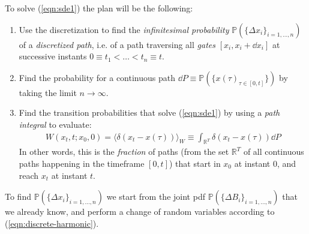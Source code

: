 \documentclass[../template.tex]{subfiles}
\begin{document}
To solve (\ref{eqn:sde1}) the plan will be the following:
\begin{enumerate}
    \item Use the discretization to find the \textit{infinitesimal probability} $\mathbb{P}(\{\Delta x_i\}_{i=1,\dots,n})$ of a \textit{discretized path}, i.e. of a path traversing all \textit{gates} $[x_i, x_i + \dd{x_i}]$ at successive instants $0 \equiv t_1 < \dots < t_n \equiv t$.
    \item Find the probability for a continuous path $\dd{P} \equiv \mathbb{P}(\{x(\tau)_{\tau \in [0,t]}\})$ by taking the limit $n \to \infty$.
    \item Find the transition probabilities that solve (\ref{eqn:sde1}) by using a \textit{path integral} to evaluate:
    \begin{align*}
        W(x_t,t;x_0,0) = \langle \delta(x_t - x(\tau)) \rangle_W \equiv \int_{\mathbb{R}^T} \delta(x_t - x(\tau)) \dd{P}    
    \end{align*}    
    In other words, this is the \textit{fraction} of paths (from the set $\mathbb{R}^T$ of all continuous paths happening in the timeframe $[0,t]$) that start in $x_0$ at instant $0$, and reach $x_t$ at instant $t$.  
\end{enumerate}

To find $\mathbb{P}(\{\Delta x_i\}_{i=1,\dots,n})$ we start from the joint pdf $\mathbb{P}(\{\Delta B_i\}_{i=1, \dots, n})$ that we already know, and perform a change of random variables according to (\ref{eqn:discrete-harmonic}).
\end{document}
